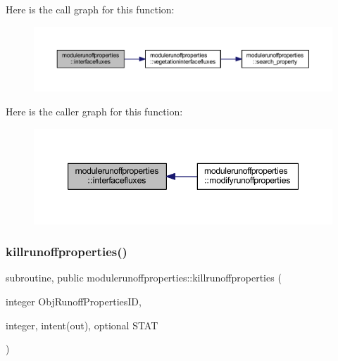 Here is the call graph for this function\+:\nopagebreak
\begin{figure}[H]
\begin{center}
\leavevmode
\includegraphics[width=350pt]{namespacemodulerunoffproperties_a076e539417a822f7177b60e8449345e3_cgraph}
\end{center}
\end{figure}
Here is the caller graph for this function\+:\nopagebreak
\begin{figure}[H]
\begin{center}
\leavevmode
\includegraphics[width=347pt]{namespacemodulerunoffproperties_a076e539417a822f7177b60e8449345e3_icgraph}
\end{center}
\end{figure}
\mbox{\label{namespacemodulerunoffproperties_ae0e5362eaddb64340c7e7f7c80f73e3e}} 
\subsubsection{\texorpdfstring{killrunoffproperties()}{killrunoffproperties()}}
{\footnotesize\ttfamily subroutine, public modulerunoffproperties\+::killrunoffproperties (\begin{DoxyParamCaption}\item[{integer}]{Obj\+Runoff\+Properties\+ID,  }\item[{integer, intent(out), optional}]{S\+T\+AT }\end{DoxyParamCaption})}

